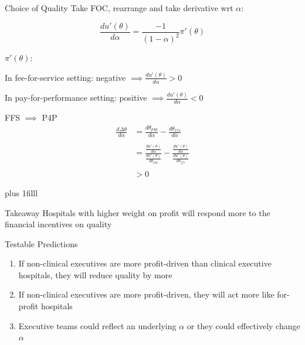 \documentclass[notes,11pt, aspectratio=169]{beamer}
\newcommand{\btVFill}{\vskip0pt plus 1filll}
\newenvironment{wideitemize}{\itemize\addtolength{\itemsep}{10pt}}{\enditemize}
\begin{document}
\begin{frame}{Choice of Quality}
Take FOC, rearrange and take derivative wrt $\alpha$:

\vspace{5mm}

\begin{equation*}
    \frac{du'(\theta)}{d\alpha} = \frac{-1}{(1-\alpha)^2}\pi'(\theta)
\end{equation*}

\vspace{5mm}

$\pi'(\theta)$:

\vspace{3mm}

\begin{wideitemize}
    \item In fee-for-service setting: negative $\implies \frac{du'(\theta)}{d\alpha} > 0$
    \item In pay-for-performance setting: positive $\implies \frac{du'(\theta)}{d\alpha} < 0$
\end{wideitemize}
    
\end{frame}

\begin{frame}{FFS $\implies$ P4P}
    \large
    \begin{align*}
        \frac{d\Delta\theta}{d\alpha}&=\frac{d\theta_{p4p}}{d\alpha}-\frac{d\theta_{ffs}}{d\alpha}\\ 
        &\\
        &=\frac{\frac{du'(\theta)}{d\alpha}}{\frac{du'(\theta)}{d\theta_{p4p}}} - \frac{\frac{du'(\theta)}{d\alpha}}{\frac{du'(\theta)}{d\theta_{ffs}}}\\
        &\\
        &> 0
    \end{align*}

    \btVFill \normalsize

    \begin{block}{Takeaway}
        Hospitals with higher weight on profit will respond more to the financial incentives on quality
    \end{block}
\end{frame}

\begin{frame}{Testable Predictions}
    \begin{enumerate}
        \item If non-clinical executives are more profit-driven than clinical executive hospitals, they will reduce quality by more

        \vspace{5mm}
        \item If non-clinical executives are more profit-driven, they will act more like for-profit hospitals 

        \vspace{5mm}
        \item Executive teams could reflect an underlying $\alpha$ or they could effectively change $\alpha$
    \end{enumerate}
\end{frame}
\end{document}
